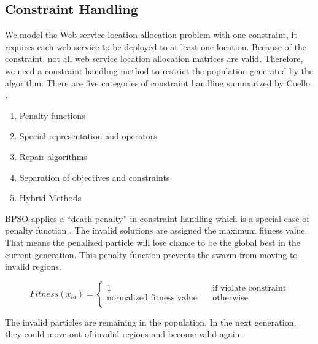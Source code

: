 \subsection{Constraint Handling}
We model the Web service location allocation problem with one constraint, it requires each web service to be deployed to at least one location.
Because of the constraint, not all web service location allocation matrices are valid. Therefore, we need a constraint handling method to restrict the population generated by the algorithm.
\label{sec:constraint}
There are five categories of constraint handling summarized by Coello \cite{coello2002theoretical}, 
\begin{enumerate}
	\item Penalty functions
	\item Special representation and operators
	\item Repair algorithms
	\item Separation of objectives and constraints
	\item Hybrid Methods
\end{enumerate}
 
BPSO applies a ``death penalty'' in constraint handling which is a special case of penalty function \cite{coello2002theoretical}.
The invalid solutions are assigned the maximum fitness value. That means the penalized 
particle will lose chance to be the global best in the current generation. This penalty function prevents the swarm from moving to invalid regions.

\begin{equation}
\label{eq:death}
		Fitness(x_{id}) = 
		\begin{cases}
			1 & \quad \text{if violate constraint} \\
			\text{normalized fitness value} & \quad \text{otherwise} \\
		\end{cases}
\end{equation}


The invalid particles are remaining in the 
population. In the next generation, they could move out of invalid regions and
become valid again.






